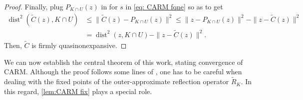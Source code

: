 \documentclass[smallextended,numbook,nospthms]{svjour3}
\theoremstyle{plain}
\theoremstyle{definition}
\DeclareMathOperator{\dist}{dist}
\begin{document}
\begin{proof}
	Finally, plug $P_{K \cap U}(z)$ in for $s$ in \cref{eq: CARM fqne} so as to get
	\begin{align}
		\dist^{2}(\tilde{C}(z), K \cap U) & \leq\|\tilde{C}(z)-P_{K \cap U}(z)\|^{2} \leq\|z-P_{K \cap U}(z)\|^{2}-\|z-\tilde{C}(z)\|^{2} \\
		&=\dist^{2}(z, K \cap U)-\|z-\tilde{C}(z)\|^{2}.
	\end{align}
	Then, $\tilde{C}$ is firmly quasinonexpansive.
\end{proof}

We can now establish the central theorem of this work, stating convergence of CARM. Although the proof follows some lines of \cite[Theorem 1]{Behling:2020}, one has to be careful when dealing with the fixed points of the outer-approximate reflection operator $\tilde{R}_{K}$. In this regard, \cref{lem:CARM fix} plays a special role.
\end{document}
